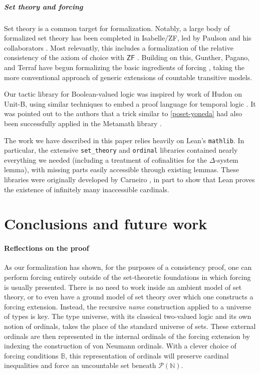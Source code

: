 \documentclass[a4paper,USenglish,cleveref, autoref]{lipics-v2019}
\newcommand{\B}{\mathbb{B}}
\newcommand{\N}{\mathbb{N}}
\theoremstyle{theorem}
\theoremstyle{definition}
\begin{document}
\subparagraph{Set theory and forcing}
Set theory is a common target for formalization. Notably, a large body of formalized set theory has been completed in Isabelle/ZF, led by Paulson and his collaborators \cite{paulson1996mechanizing, paulson1993set, paulson2002reflection}. Most relevantly, this includes a formalization of the relative consistency of the axiom of choice with $\mathsf{ZF}$ \cite{paulson2008relative}. Building on this, Gunther, Pagano, and Terraf have begun formalizing the basic ingredients of forcing \cite{gunther2018first, gunther2019mechanization}, taking the more conventional approach of generic extensions of countable transitive models.

Our tactic library for Boolean-valued logic was inspired by work of Hudon \cite{Hudon2015TheUM} on Unit-B, using similar techniques to embed a proof language for temporal logic \cite{unitb}. It was pointed out to the authors that a trick similar to \autoref{poset-yoneda} had also been successfully applied in the Metamath library \cite{mario2}.

The work we have described in this paper relies heavily on Lean's \lstinline{mathlib}. In particular, the extensive \lstinline{set_theory} and \lstinline{ordinal} libraries contained nearly everything we needed (including a treatment of cofinalities for the $\Delta$-system lemma), with missing parts easily accessible through existing lemmas. These libraries were originally developed by Carneiro \cite{mario1}, in part to show that Lean proves the existence of infinitely many inaccessible cardinals.

\section{Conclusions and future work}
\paragraph*{Reflections on the proof}
As our formalization has shown, for the purposes of a consistency proof, one can perform forcing entirely outside of the set-theoretic foundations in which forcing is usually presented. There is no need to work inside an ambient model of set theory, or to even have a ground model of set theory over which one constructs a forcing extension. Instead, the recursive \emph{name} construction applied to a universe of types is key. The type universe, with its classical two-valued logic and its own notion of ordinals, takes the place of the standard universe of sets. These external ordinals are then represented in the internal ordinals of the forcing extension by indexing the construction of von Neumann ordinals. With a clever choice of forcing conditions $\B$, this representation of ordinals will preserve cardinal inequalities and force an uncountable set beneath $\mathcal{P}(\N)$.
\end{document}
